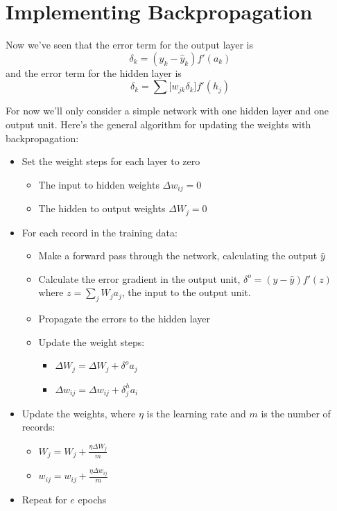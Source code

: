 \section{Implementing Backpropagation}

Now we've seen that the error term for the output layer is \[\delta_k = (y_k - \hat{y}_k) f'(a_k)\]
and the error term for the hidden layer is \[\delta_k = \sum \big[w_{jk} \delta_k \big] f'(h_j)\]

For now we'll only consider a simple network with one hidden layer and one output unit. Here's the general algorithm for updating the weights with backpropagation:
\begin{itemize}
    \item Set the weight steps for each layer to zero
    \begin{itemize}
        \item The input to hidden weights \(\Delta w_{ij} = 0\)
        \item The hidden to output weights  \(\Delta W_j = 0\)
    \end{itemize}
    \item For each record in the training data:
    \begin{itemize}
        \item Make a forward pass through the network, calculating the output \(\hat{y}\)
        \item Calculate the error gradient in the output unit, \(\delta^o = (y - \hat{y})f'(z)\) where \(z = \sum_j W_j a_j\), the input to the output unit.
        \item Propagate the errors to the hidden layer 
        \item Update the weight steps:
        \begin{itemize}
            \item \(\Delta W_j = \Delta W_j + \delta^o a_j\)
            \item \(\Delta w_{ij} = \Delta w_{ij} + \delta_j^h a_i\)
        \end{itemize}
    \end{itemize}
    \item Update the weights, where \(\eta\) is the learning rate and \(m\) is the number of records:
    \begin{itemize}
        \item \(W_j = W_j + \frac{\eta \Delta W_j}{m}\)
        \item \(w_{ij} = w_{ij} + \frac{\eta \Delta w_{ij}}{m}\)
    \end{itemize}
    \item Repeat for \(e\) epochs
\end{itemize}


